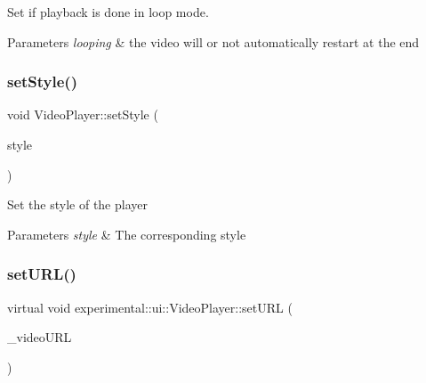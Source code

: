 Set if playback is done in loop mode. 


\begin{DoxyParams}{Parameters}
{\em looping} & the video will or not automatically restart at the end \\
\hline
\end{DoxyParams}
\mbox{\label{classexperimental_1_1ui_1_1VideoPlayer_a89e6a62ff9b3b05281a31180098a1ed3}} 
\subsubsection{\texorpdfstring{set\+Style()}{setStyle()}}
{\footnotesize\ttfamily void Video\+Player\+::set\+Style (\begin{DoxyParamCaption}\item[{\hyperlink{classexperimental_1_1ui_1_1VideoPlayer_a65711269d4eca8fe125aeda2928a80ec}{Style\+Type}}]{style }\end{DoxyParamCaption})\hspace{0.3cm}{\ttfamily [virtual]}}

Set the style of the player


\begin{DoxyParams}{Parameters}
{\em style} & The corresponding style \\
\hline
\end{DoxyParams}
\mbox{\label{classexperimental_1_1ui_1_1VideoPlayer_a2491bab42a29abbb44710aecb730b566}} 
\subsubsection{\texorpdfstring{set\+U\+R\+L()}{setURL()}\hspace{0.1cm}{\footnotesize\ttfamily [1/2]}}
{\footnotesize\ttfamily virtual void experimental\+::ui\+::\+Video\+Player\+::set\+U\+RL (\begin{DoxyParamCaption}\item[{const std\+::string \&}]{\+\_\+video\+U\+RL }\end{DoxyParamCaption})\hspace{0.3cm}{\ttfamily [virtual]}}


